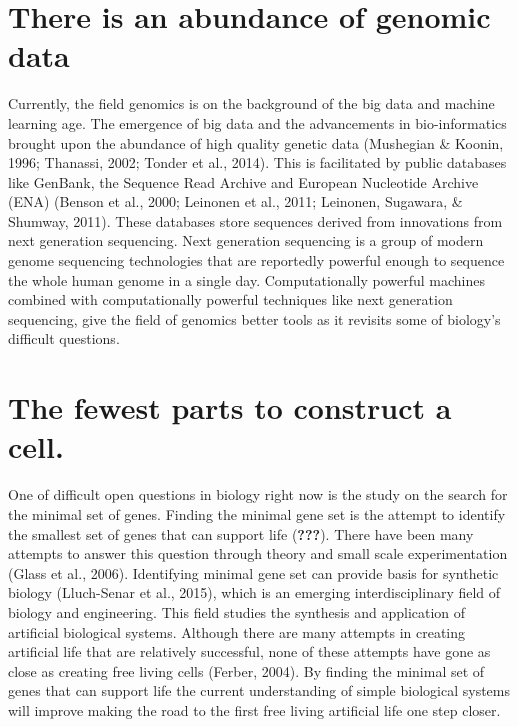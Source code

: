 \documentclass[]{report}
\begin{document}
\section{There is an abundance of genomic
data}\label{there-is-an-abundance-of-genomic-data}

Currently, the field genomics is on the background of the big data and
machine learning age. The emergence of big data and the advancements in
bio-informatics brought upon the abundance of high quality genetic data
(Mushegian \& Koonin, 1996; Thanassi, 2002; Tonder et al., 2014). This
is facilitated by public databases like GenBank, the Sequence Read
Archive and European Nucleotide Archive (ENA) (Benson et al., 2000;
Leinonen et al., 2011; Leinonen, Sugawara, \& Shumway, 2011). These
databases store sequences derived from innovations from next generation
sequencing. Next generation sequencing is a group of modern genome
sequencing technologies that are reportedly powerful enough to sequence
the whole human genome in a single day. Computationally powerful
machines combined with computationally powerful techniques like next
generation sequencing, give the field of genomics better tools as it
revisits some of biology's difficult questions.

\section{The fewest parts to construct a
cell.}\label{the-fewest-parts-to-construct-a-cell.}

One of difficult open questions in biology right now is the study on the
search for the minimal set of genes. Finding the minimal gene set is the
attempt to identify the smallest set of genes that can support life
({\textbf{???}}). There have been many attempts to answer this question
through theory and small scale experimentation (Glass et al., 2006).
Identifying minimal gene set can provide basis for synthetic biology
(Lluch-Senar et al., 2015), which is an emerging interdisciplinary field
of biology and engineering. This field studies the synthesis and
application of artificial biological systems. Although there are many
attempts in creating artificial life that are relatively successful,
none of these attempts have gone as close as creating free living cells
(Ferber, 2004). By finding the minimal set of genes that can support
life the current understanding of simple biological systems will improve
making the road to the first free living artificial life one step
closer.
\end{document}
